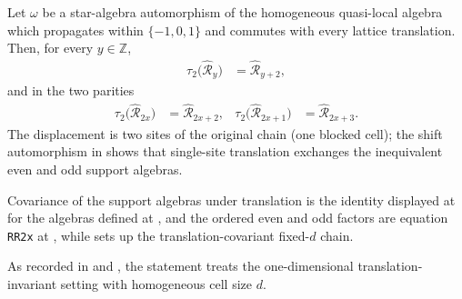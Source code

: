 \begin{lemma}
    \label{thm:qca_site_indexed_support_algebras_two_site_covariance}
    \leanok
    Let $\omega$ be a star-algebra automorphism of the homogeneous quasi-local
    algebra which propagates within $\{-1,0,1\}$ and commutes with every
    lattice translation.  Then, for every $y\in\mathbb Z$,
    \begin{align}
        \tau_2\bigl(\widehat{\mathcal R}_y\bigr)
         & =\widehat{\mathcal R}_{y+2},
        \label{eq:qca_two_site_covariance}
    \end{align}
    and in the two parities
    \begin{align}
        \tau_2\bigl(\widehat{\mathcal R}_{2x}\bigr)
         & =\widehat{\mathcal R}_{2x+2}, &
        \tau_2\bigl(\widehat{\mathcal R}_{2x+1}\bigr)
         & =\widehat{\mathcal R}_{2x+3}.
        \label{eq:qca_two_site_covariance_parities}
    \end{align}
    The displacement is two sites of the original chain (one blocked cell); the
    shift automorphism in \cite[lines~1267--1268]{Gross2012IndexTheory} shows
    that single-site translation exchanges the inequivalent even and odd support
    algebras.

    Covariance of the support algebras under translation is the identity
    displayed at
    \cite[lines~1218--1226]{SchumacherWerner2004QCA} for the algebras defined
    at \cite[lines~1199--1206]{SchumacherWerner2004QCA}, and the ordered even
    and odd factors are equation \texttt{RR2x} at
    \cite[lines~1251--1266]{Gross2012IndexTheory}, while \cite[lines~2292--2298]{Cirac2017MPU} sets up the translation-covariant
    fixed-$d$
    chain.

    As recorded in \cite{gap:sw04_support_covariance_scope} and \cite{gap:gnvw12_site_dependent_adjacent_generation_scope}, the statement treats the one-dimensional translation-invariant
    setting with homogeneous cell size
    $d$.
\end{lemma}

